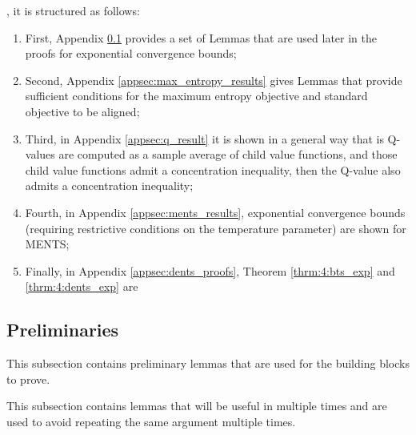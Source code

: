     , it is structured as follows:
    \begin{enumerate}
        \item First, Appendix \ref{appsec:exp-prelim} provides a set of Lemmas that are used later in the proofs for exponential convergence bounds;
        \item Second, Appendix \ref{appsec:max_entropy_results} gives Lemmas that provide sufficient conditions for the maximum entropy objective and standard objective to be aligned;
        \item Third, in Appendix \ref{appsec:q_result} it is shown in a general way that is Q-values are computed as a sample average of child value functions, and those child value functions admit a concentration inequality, then the Q-value also admits a concentration inequality;
        \item Fourth, in Appendix \ref{appsec:ments_results}, exponential convergence bounds (requiring restrictive conditions on the temperature parameter) are shown for MENTS; 
        \item Finally, in Appendix \ref{appsec:dents_proofs}, Theorem \ref{thrm:4:bts_exp} and \ref{thrm:4:dents_exp} are 
    \end{enumerate}




    \subsection{Preliminaries}
    \label{appsec:exp-prelim}

        This subsection contains preliminary lemmas that are used for the building blocks to prove.
        




            This subsection contains lemmas that will be useful in multiple times and are used to avoid repeating the same argument multiple times. 

            





